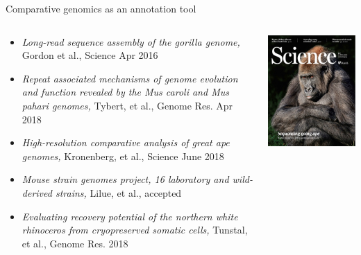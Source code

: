 \documentclass[10pt,
               hyperref={bookmarks=false,
                         bookmarksopen=false,
                         colorlinks=true,
                         linkcolor=blue,
                         urlcolor=blue},
               xcolor={svgnames,table}]{beamer}
\newenvironment{tightitemize}{%
\begin{itemize}
  \setlength{\itemsep}{1pt}%
  \setlength{\parskip}{0pt}%
  \setlength{\parsep}{0pt}%
}{\end{itemize}}
\newcommand\paperref[4]{%
  {\it #1, }{ #2,}{ #3}
}
\begin{document}
\begin{frame}{Comparative genomics as an annotation tool}
  \begin{columns}
    \begin{column}{0.80\textwidth}
      \begin{tightitemize}
      \item \paperref{Long-read sequence assembly of the gorilla genome}
        {Gordon et al.}{Science Apr 2016}{10.1126/science.aae0344}
      \item \paperref{Repeat associated mechanisms of genome evolution and function revealed by the Mus caroli and Mus pahari genomes}
        {Tybert, et al.}{Genome Res. Apr 2018}{10.1101/gr.234096.117}
      \item \paperref{High-resolution comparative analysis of great ape genomes}
        {Kronenberg, et al.}{Science June 2018}{10.1126/science.aar6343}
      \item \paperref{Mouse strain genomes project, 16 laboratory and wild-derived strains}
        {Lilue, et al.}{accepted}{}
      \item \paperref{Evaluating recovery potential of the northern white rhinoceros from cryopreserved somatic cells}
        {Tunstal, et al.}{Genome Res. 2018}{10.1101/gr.227603.117}
      \end{tightitemize}
    \end{column}
    \begin{column}{0.20\textwidth}
      \includegraphics[scale=0.2]{images/science-gorilla.jpg}

\end{column}
\end{columns}
\end{frame}
\end{document}
